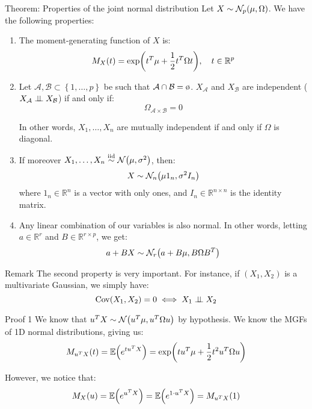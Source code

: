 \documentclass[a4paper]{article}
\begin{document}
\begin{parag}{Theorem: Properties of the joint normal distribution}
    Let $X \followsdistr \mathcal{N}_p\left(\mu, \Omega\right)$. We have the following properties:
    \begin{enumerate}
        \item The moment-generating function of $X$ is: 
        \[M_X\left(t\right) = \exp\left(t^T \mu + \frac{1}{2} t^T \Omega t\right), \mathspace t \in \mathbb{R}^p\]
        \item Let $\mathcal{A}, \mathcal{B} \subset \left\{1, \ldots, p\right\}$ be such that $\mathcal{A} \cap \mathcal{B} = \o$. $X_{\mathcal{A}}$ and $X_{\mathcal{B}}$ are independent ($X_{\mathcal{A}} \mathrel{\perp\!\!\!\perp} X_{\mathcal{B}}$) if and only if: 
        \[\Omega_{\mathcal{A}\times\mathcal{B}} = 0\]

        In other words, $X_1, \ldots, X_n$ are mutually independent if and only if $\Omega$ is diagonal.
        \item If moreover $X_1, \ldots, X_n \iid \mathcal{N}\left(\mu, \sigma^2\right)$, then: 
        \[X \followsdistr \mathcal{N}_n\left(\mu 1_n, \sigma^2 I_n\right)\]
        where $1_n \in \mathbb{R}^n$ is a vector with only ones, and $I_n \in \mathbb{R}^{n \times n}$ is the identity matrix.
        \item Any linear combination of our variables is also normal. In other words, letting $a \in \mathbb{R}^{r}$ and $B \in \mathbb{R}^{r \times p}$, we get:
        \[a + B X \followsdistr \mathcal{N}_r\left(a + B \mu, B \Omega B^T\right)\]
    \end{enumerate}
    
    \begin{subparag}{Remark}
        The second property is very important. For instance, if $\left(X_1, X_2\right)$ is a multivariate Gaussian, we simply have: 
        \[\Cov\left(X_1, X_2\right) = 0 \iff X_1 \independent X_2\]
    \end{subparag}

    \begin{subparag}{Proof 1}
        We know that $u^T X \followsdistr \mathcal{N}\left(u^T \mu, u^T \Omega u\right)$ by hypothesis. We know the MGFs of 1D normal distributions, giving us:
        \[M_{u^T X}\left(t\right) = \exval\left(e^{t u^T X}\right) = \exp\left(t u^T \mu + \frac{1}{2} t^2 u^T \Omega u\right)\]
        
        However, we notice that: 
        \[M_X\left(u\right) = \exval \left(e^{u^T X}\right) = \exval\left(e^{1\cdot  u^T X}\right) = M_{u^T X}\left(1\right)\]


\end{subparag}
\end{parag}
\end{document}
